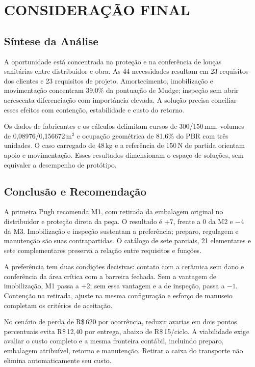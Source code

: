 \clearpage
\section{CONSIDERAÇÃO FINAL}

\subsection{Síntese da Análise}

A oportunidade está concentrada na proteção e na conferência de louças sanitárias entre distribuidor e obra. As 44 necessidades resultam em 23 requisitos dos clientes e 23 requisitos de projeto. Amortecimento, imobilização e movimentação concentram 39,0\% da pontuação de Mudge; inspeção sem abrir acrescenta diferenciação com importância elevada. A solução precisa conciliar esses efeitos com contenção, estabilidade e custo do retorno.

Os dados de fabricantes e os cálculos delimitam cursos de 300/150\,mm, volumes de 0,08976/0,156672\,m$^3$ e ocupação geométrica de 81,6\% do PBR com três unidades. O caso carregado de 48\,kg e a referência de 150\,N de partida orientam apoio e movimentação. Esses resultados dimensionam o espaço de soluções, sem equivaler a desempenho de protótipo.

\subsection{Conclusão e Recomendação}

A primeira Pugh recomenda M1, com retirada da embalagem original no distribuidor e proteção direta da peça. O resultado é +7, frente a 0 da M2 e $-4$ da M3. Imobilização e inspeção sustentam a preferência; preparo, regulagem e manutenção são suas contrapartidas. O catálogo de sete parciais, 21 elementares e sete complementares preserva a relação entre requisitos e funções.

A preferência tem duas condições decisivas: contato com a cerâmica sem dano e conferência da área crítica com a barreira fechada. Sem a vantagem de imobilização, M1 passa a +2; sem essa vantagem e a de inspeção, passa a $-1$. Contenção na retirada, ajuste na mesma configuração e esforço de manuseio completam os critérios de aceitação.

No cenário de perda de R\$\,620 por ocorrência, reduzir avarias em dois pontos percentuais evita R\$\,12,40 por entrega, abaixo de R\$\,15/ciclo. A viabilidade exige avaliar o custo completo e a mesma fronteira contábil, incluindo preparo, embalagem atribuível, retorno e manutenção. Retirar a caixa do transporte não elimina automaticamente seu custo.

